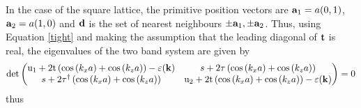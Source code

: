 \documentclass[a4paper, 12pt]{article}
\begin{document}
\par	In the case of the square lattice, the primitive position vectors are ${\bf a}_1 = a(0,1)$, \quad ${\bf a}_2 = a(1,0)$ and ${\bf d}$ is the set of nearest neighbours $\pm {\bf a}_1, \pm {\bf a}_2$.
Thus, using Equation \eqref{tight} and making the assumption that the leading diagonal of $\bf t$ is real, the eigenvalues of the two band system are given by
	\begin{equation}
		\rm det \begin{pmatrix} {\rm u}_1+2{\rm t}\left(\cos \left( k_xa \right)+ \cos \left( k_za \right)\right)-\varepsilon(\bf k) &s+2\tau
			\left(\cos \left( k_xa \right)+ \cos \left( k_za \right)\right) \\ s+2
			\tau^\dagger\left(\cos \left( k_xa \right)+ \cos \left( k_za \right)\right) &{\rm u}_2+2{\rm t}\left(\cos \left( k_xa \right)+ \cos \left( k_za \right)\right)-\varepsilon(\bf k) \end{pmatrix} =0
	\end{equation}
	thus
\end{document}
